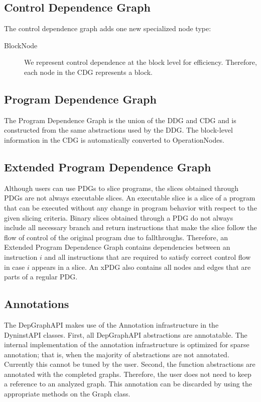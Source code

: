 \documentclass[12pt,titlepage]{article}
\begin{document}
\subsection{Control Dependence Graph}

The control dependence graph adds one new specialized node type:

\begin{description}
\item[BlockNode] We represent
control dependence at the block level for efficiency. Therefore, each
node in the CDG represents a block. 
\end{description}

\subsection{Program Dependence Graph}
The Program Dependence Graph is the union of the DDG and CDG and is
constructed from the same abstractions used by the DDG. The
block-level information in the CDG is automatically converted to
OperationNodes.

\subsection{Extended Program Dependence Graph}
Although users can use PDGs to slice programs, the slices obtained through PDGs
are not always executable slices. An executable slice is a slice of a program that
can be executed without any change in program behavior with respect to the
given slicing criteria. Binary slices obtained through a PDG do not always
include all necessary branch and return instructions that make the slice follow
the flow of control of the original program due to fallthroughs. Therefore, an
Extended Program Dependence Graph contains dependencies between an instruction
$i$ and all instructions that are required to satisfy correct control flow
in case $i$ appears in a slice. An xPDG also contains all nodes and edges
that are parts of a regular PDG.

\subsection{Annotations} 

The DepGraphAPI makes use of the Annotation infrastructure in the
DyninstAPI classes. First, all DepGraphAPI abstractions are
annotatable. The internal implementation of the annotation
infrastructure is optimized for sparse annotation; that is, when the
majority of abstractions are not annotated. Currently this cannot be
tuned by the user. Second, the function abstractions are annotated
with the completed graphs. Therefore, the user does not need to keep a
reference to an analyzed graph. This annotation can be discarded by
using the appropriate methods on the Graph class.
\end{document}
